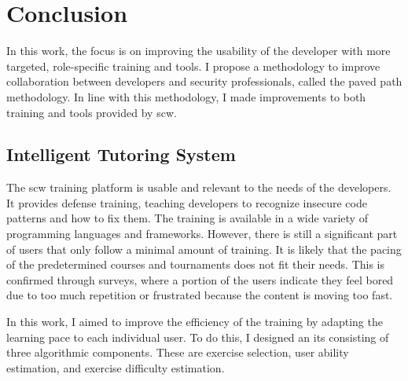 \chapter{Conclusion}
\glsresetall

In this work, the focus is on improving the usability of the developer with more targeted, role-specific training and tools.
I propose a methodology to improve collaboration between developers and security professionals, called the paved path methodology.
In line with this methodology, I made improvements to both training and tools provided by \gls{scw}.


\section{Intelligent Tutoring System}
The \gls{scw} training platform is usable and relevant to the needs of the developers.
It provides defense training, teaching developers to recognize insecure code patterns and how to fix them.
The training is available in a wide variety of programming languages and frameworks.
However, there is still a significant part of users that only follow a minimal amount of training.
It is likely that the pacing of the predetermined courses and tournaments does not fit their needs.
This is confirmed through surveys, where a portion of the users indicate they feel bored due to too much repetition or frustrated because the content is moving too fast.

In this work, I aimed to improve the efficiency of the training by adapting the learning pace to each individual user.
To do this, I designed an \gls{its} consisting of three algorithmic components.
These are exercise selection, user ability estimation, and exercise difficulty estimation.

